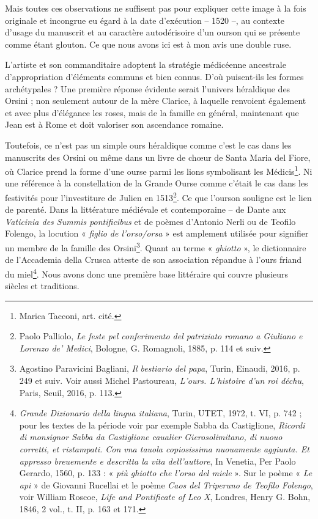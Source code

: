 \documentclass[12pt,twoside,openany]{book}
\begin{document}
Mais toutes ces observations ne suffisent pas pour expliquer cette image à la fois originale et incongrue eu égard à la date d’exécution – 1520 –, au contexte d’usage du manuscrit et au caractère autodérisoire d’un ourson qui se présente comme étant glouton. Ce que nous avons ici est à mon avis une double ruse.

L’artiste et son commanditaire adoptent la stratégie médicéenne ancestrale d’appropriation d’éléments communs et bien connus. D’où puisent-ils les formes archétypales ? Une première réponse évidente serait l’univers héraldique des Orsini ; non seulement autour de la mère Clarice, à laquelle renvoient également et avec plus d’élégance les roses, mais de la famille en général, maintenant que Jean est à Rome et doit valoriser son ascendance romaine.

Toutefois, ce n’est pas un simple ours héraldique comme c’est le cas dans les manuscrits des Orsini ou même dans un livre de chœur de Santa Maria del Fiore, où Clarice prend la forme d’une ourse parmi les lions symbolisant les Médicis\footnote{Marica Tacconi, art. cité.}. Ni une référence à la constellation de la Grande Ourse comme c’était le cas dans les festivités pour l’investiture de Julien en 1513\footnote{Paolo Palliolo, \textit{Le feste pel conferimento del patriziato romano a Giuliano e Lorenzo de’ Medici}, Bologne, G. Romagnoli, 1885, p. 114 et suiv.}. Ce que l’ourson souligne est le lien de parenté. Dans la littérature médiévale et contemporaine – de Dante aux \textit{Vaticinia des Summis pontificibus} et de poèmes d’Antonio Nerli ou de Teofilo Folengo, la locution « \textit{figlio de l’orso/orsa }» est amplement utilisée pour signifier un membre de la famille des Orsini\footnote{Agostino Paravicini Bagliani, \textit{Il bestiario del papa}, Turin, Einaudi, 2016, p. 249 et suiv. Voir aussi Michel Pastoureau, \textit{L’ours. L’histoire d’un roi déchu}, Paris, Seuil, 2016, p. 113.}. Quant au terme « \textit{ghiotto }», le dictionnaire de l’Accademia della Crusca atteste de son association répandue à l’ours friand du miel\footnote{\textit{Grande Dizionario della lingua italiana}, Turin, UTET, 1972, t. VI, p. 742 ; pour les textes de la période voir par exemple Sabba da Castiglione, \textit{Ricordi di monsignor Sabba da Castiglione caualier Gierosolimitano, di nuouo corretti, et ristampati. Con vna tauola copiosissima nuouamente aggiunta. Et appresso breuemente e descritta la vita dell’auttore}, In Venetia, Per Paolo Gerardo, 1560, p. 133 : « \textit{più ghiotto che l’orso del miele} ». Sur le poème « \textit{Le api} » de Giovanni Rucellai et le poème \textit{Caos del Triperuno de Teofilo Folengo}, voir William Roscoe, \textit{Life and Pontificate of Leo X}, Londres, Henry G. Bohn, 1846, 2 vol., t. II, p. 163 et 171.}. Nous avons donc une première base littéraire qui couvre plusieurs siècles et traditions.
\end{document}
